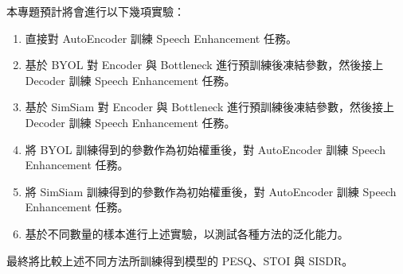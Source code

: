 \documentclass[10pt,twocolumn,letterpaper]{article}
\begin{document}
\begin{CJK}{UTF8}{bkai}
   本專題預計將會進行以下幾項實驗：
   \begin{enumerate}
      \item 直接對 AutoEncoder 訓練 Speech Enhancement 任務。
      \item 基於 BYOL 對 Encoder 與 Bottleneck 進行預訓練後凍結參數，然後接上 Decoder 訓練 Speech Enhancement 任務。
      \item 基於 SimSiam 對 Encoder 與 Bottleneck 進行預訓練後凍結參數，然後接上 Decoder 訓練 Speech Enhancement 任務。
      \item 將 BYOL 訓練得到的參數作為初始權重後，對 AutoEncoder 訓練 Speech Enhancement 任務。
      \item 將 SimSiam 訓練得到的參數作為初始權重後，對 AutoEncoder 訓練 Speech Enhancement 任務。
      \item 基於不同數量的樣本進行上述實驗，以測試各種方法的泛化能力。
   \end{enumerate}

   最終將比較上述不同方法所訓練得到模型的 PESQ\cite{mildenhall2020nerf}、STOI\cite{mildenhall2020nerf} 與 SISDR\cite{mildenhall2020nerf}。


   {\small
   
   
   }
\end{CJK}
\end{document}
